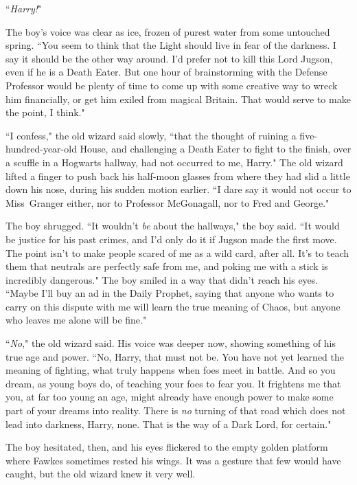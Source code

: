 ``\emph{Harry!}"

The boy's voice was clear as ice, frozen of purest water from some untouched spring. ``You seem to think that the Light should live in fear of the darkness. I say it should be the other way around. I'd prefer not to kill this Lord Jugson, even if he is a Death Eater. But one hour of brainstorming with the Defense Professor would be plenty of time to come up with some creative way to wreck him financially, or get him exiled from magical Britain. That would serve to make the point, I think."

``I confess," the old wizard said slowly, ``that the thought of ruining a five-hundred-year-old House, and challenging a Death Eater to fight to the finish, over a scuffle in a Hogwarts hallway, had not occurred to me, Harry." The old wizard lifted a finger to push back his half-moon glasses from where they had slid a little down his nose, during his sudden motion earlier. ``I dare say it would not occur to Miss~Granger either, nor to Professor McGonagall, nor to Fred and George."

The boy shrugged. ``It wouldn't \emph{be} about the hallways," the boy said. ``It would be justice for his past crimes, and I'd only do it if Jugson made the first move. The point isn't to make people scared of me as a wild card, after all. It's to teach them that neutrals are perfectly safe from me, and poking me with a stick is incredibly dangerous." The boy smiled in a way that didn't reach his eyes. ``Maybe I'll buy an ad in the Daily Prophet, saying that anyone who wants to carry on this dispute with me will learn the true meaning of Chaos, but anyone who leaves me alone will be fine."

``\emph{No}," the old wizard said. His voice was deeper now, showing something of his true age and power. ``No, Harry, that must not be. You have not yet learned the meaning of fighting, what truly happens when foes meet in battle. And so you dream, as young boys do, of teaching your foes to fear you. It frightens me that you, at far too young an age, might already have enough power to make some part of your dreams into reality. There is \emph{no} turning of that road which does not lead into darkness, Harry, none. That is the way of a Dark Lord, for certain."

The boy hesitated, then, and his eyes flickered to the empty golden platform where Fawkes sometimes rested his wings. It was a gesture that few would have caught, but the old wizard knew it very well.

